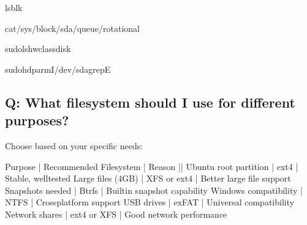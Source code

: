 \documentclass[letterpaper,10pt,english]{sphinxmanual}
\begin{document}
\begin{sphinxVerbatim}[commandchars=\\\{\}]
lsblk

cat/sys/block/sda/queue/rotational

sudolshw\PYGZhy{}classdisk

sudohdparm\PYGZhy{}I/dev/sdagrep\PYGZhy{}E
\end{sphinxVerbatim}


\subsection{Q: What filesystem should I use for different purposes?}
\label{\detokenize{faq:q-what-filesystem-should-i-use-for-different-purposes}}
\sphinxAtStartPar
{} Choose based on your specific needs:

\begin{sphinxVerbatim}[commandchars=\\\{\}]
Purpose                | Recommended Filesystem | Reason
\PYGZhy{}\PYGZhy{}\PYGZhy{}\PYGZhy{}\PYGZhy{}\PYGZhy{}\PYGZhy{}\PYGZhy{}\PYGZhy{}\PYGZhy{}\PYGZhy{}\PYGZhy{}\PYGZhy{}\PYGZhy{}\PYGZhy{}\PYGZhy{}\PYGZhy{}\PYGZhy{}\PYGZhy{}\PYGZhy{}\PYGZhy{}\PYGZhy{}\PYGZhy{}|\PYGZhy{}\PYGZhy{}\PYGZhy{}\PYGZhy{}\PYGZhy{}\PYGZhy{}\PYGZhy{}\PYGZhy{}\PYGZhy{}\PYGZhy{}\PYGZhy{}\PYGZhy{}\PYGZhy{}\PYGZhy{}\PYGZhy{}\PYGZhy{}\PYGZhy{}\PYGZhy{}\PYGZhy{}\PYGZhy{}\PYGZhy{}\PYGZhy{}\PYGZhy{}\PYGZhy{}|\PYGZhy{}\PYGZhy{}\PYGZhy{}\PYGZhy{}\PYGZhy{}\PYGZhy{}\PYGZhy{}\PYGZhy{}\PYGZhy{}\PYGZhy{}\PYGZhy{}\PYGZhy{}\PYGZhy{}\PYGZhy{}\PYGZhy{}\PYGZhy{}\PYGZhy{}\PYGZhy{}
Ubuntu root partition | ext4                   | Stable, well\PYGZhy{}tested
Large files (\PYGZgt{}4GB)    | XFS or ext4           | Better large file support
Snapshots needed       | Btrfs                 | Built\PYGZhy{}in snapshot capability
Windows compatibility  | NTFS                  | Cross\PYGZhy{}platform support
USB drives            | exFAT                 | Universal compatibility
Network shares        | ext4 or XFS           | Good network performance
\end{sphinxVerbatim}
\end{document}
